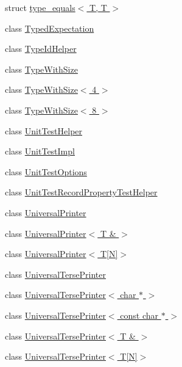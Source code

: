 \begin{DoxyCompactItemize}
struct \hyperlink{structtesting_1_1internal_1_1type__equals_3_01_t_00_01_t_01_4}{type\+\_\+equals$<$ T, T $>$}
\item 
class \hyperlink{classtesting_1_1internal_1_1_typed_expectation}{Typed\+Expectation}
\item 
class \hyperlink{classtesting_1_1internal_1_1_type_id_helper}{Type\+Id\+Helper}
\item 
class \hyperlink{classtesting_1_1internal_1_1_type_with_size}{Type\+With\+Size}
\item 
class \hyperlink{classtesting_1_1internal_1_1_type_with_size_3_014_01_4}{Type\+With\+Size$<$ 4 $>$}
\item 
class \hyperlink{classtesting_1_1internal_1_1_type_with_size_3_018_01_4}{Type\+With\+Size$<$ 8 $>$}
\item 
class \hyperlink{classtesting_1_1internal_1_1_unit_test_helper}{Unit\+Test\+Helper}
\item 
class \hyperlink{classtesting_1_1internal_1_1_unit_test_impl}{Unit\+Test\+Impl}
\item 
class \hyperlink{classtesting_1_1internal_1_1_unit_test_options}{Unit\+Test\+Options}
\item 
class \hyperlink{classtesting_1_1internal_1_1_unit_test_record_property_test_helper}{Unit\+Test\+Record\+Property\+Test\+Helper}
\item 
class \hyperlink{classtesting_1_1internal_1_1_universal_printer}{Universal\+Printer}
\item 
class \hyperlink{classtesting_1_1internal_1_1_universal_printer_3_01_t_01_6_01_4}{Universal\+Printer$<$ T \& $>$}
\item 
class \hyperlink{classtesting_1_1internal_1_1_universal_printer_3_01_t[_n]_4}{Universal\+Printer$<$ T\mbox{[}\+N\mbox{]}$>$}
\item 
class \hyperlink{classtesting_1_1internal_1_1_universal_terse_printer}{Universal\+Terse\+Printer}
\item 
class \hyperlink{classtesting_1_1internal_1_1_universal_terse_printer_3_01char_01_5_01_4}{Universal\+Terse\+Printer$<$ char $\ast$ $>$}
\item 
class \hyperlink{classtesting_1_1internal_1_1_universal_terse_printer_3_01const_01char_01_5_01_4}{Universal\+Terse\+Printer$<$ const char $\ast$ $>$}
\item 
class \hyperlink{classtesting_1_1internal_1_1_universal_terse_printer_3_01_t_01_6_01_4}{Universal\+Terse\+Printer$<$ T \& $>$}
\item 
class \hyperlink{classtesting_1_1internal_1_1_universal_terse_printer_3_01_t[_n]_4}{Universal\+Terse\+Printer$<$ T\mbox{[}\+N\mbox{]}$>$}

\end{DoxyCompactItemize}
